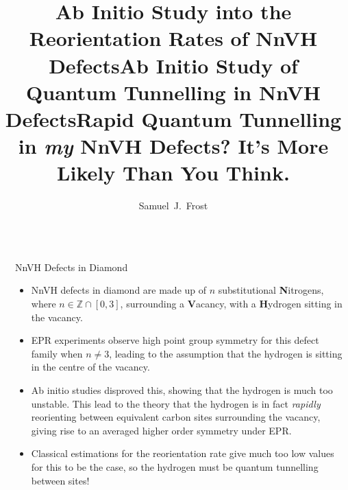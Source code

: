 \documentclass[final]{beamer}
\title{Ab Initio Study into the Reorientation Rates of NnVH Defects}
\title{Ab Initio Study of Quantum Tunnelling in NnVH Defects}
\title{Rapid Quantum Tunnelling in \emph{my} NnVH Defects? It's More Likely Than You Think.}
\author{Samuel~J.~Frost}
\institute[shortinst]{University of Warwick}
\newlength{\sepwidth}
\newlength{\colwidth}
\newcommand{\separatorcolumn}{\begin{column}{\sepwidth}\end{column}}
\newcommand{\todo}[1]{\textcolor{red}{#1}}
\begin{document}
\begin{frame}[t]
\begin{columns}[t]
\separatorcolumn

\begin{column}{\colwidth}
    
  \begin{block}{NnVH Defects in Diamond}
    \begin{itemize}
        \item NnVH defects in diamond are made up of \textbf{$n$} substitutional \textbf{N}itrogens,  where $n \in \mathbb{Z} \cap [0, 3]$, surrounding a \textbf{V}acancy, with a \textbf{H}ydrogen sitting in the vacancy.
        \item EPR experiments observe high point group symmetry for this defect family when $n \neq 3$, leading to the assumption that the hydrogen is sitting in the centre of the vacancy.
        \item Ab initio studies disproved this, showing that the hydrogen is much too unstable. This lead to the theory that the hydrogen is in fact \emph{rapidly} reorienting between equivalent carbon sites surrounding the vacancy, giving rise to an averaged higher order symmetry under EPR.
        \item Classical estimations for the reorientation rate give much too low values for this to be the case, so the hydrogen must be quantum tunnelling between sites!
        

        
    \end{itemize}


\end{block}
\end{column}
\end{columns}
\end{frame}
\end{document}
